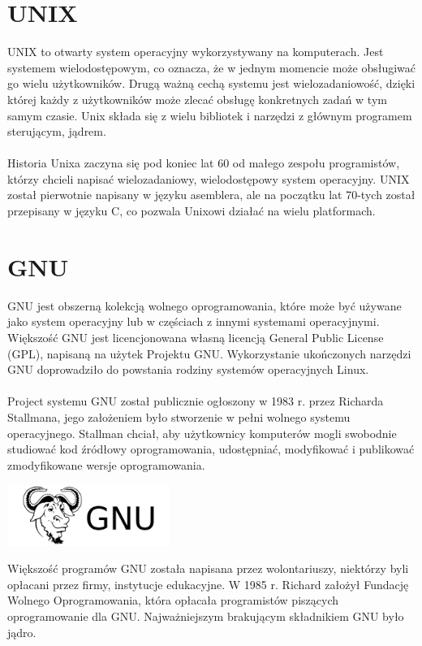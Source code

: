 \documentclass[10pt,a4paper]{report}
\begin{document}
\begin{adjustwidth}{2cm}{2cm}
\section{UNIX}
\begin{minipage}{1\linewidth}
UNIX to otwarty system operacyjny wykorzystywany na komputerach. Jest systemem wielodostępowym, co oznacza, że w jednym momencie może obsługiwać go wielu użytkowników. Drugą ważną cechą systemu jest wielozadaniowość, dzięki której każdy z użytkowników może zlecać obsługę konkretnych zadań w tym samym czasie. Unix składa się z wielu bibliotek i narzędzi z głównym programem sterującym, jądrem. \\ \\

Historia Unixa zaczyna się pod koniec lat 60 od małego zespołu programistów, którzy chcieli napisać wielozadaniowy, wielodostępowy system operacyjny.
UNIX został pierwotnie napisany w języku asemblera, ale na początku lat 70-tych został przepisany w języku  C, co pozwala Unixowi działać na wielu platformach. 
\end{minipage}
\section{GNU}
\begin{minipage}{1\linewidth}
GNU jest obszerną kolekcją wolnego oprogramowania, które może być używane jako system operacyjny lub w częściach z innymi systemami operacyjnymi. Większość GNU jest licencjonowana własną licencją General Public License (GPL), napisaną na użytek Projektu GNU.  Wykorzystanie ukończonych narzędzi GNU doprowadziło do powstania rodziny systemów operacyjnych Linux. \\  \\
Project systemu GNU został publicznie ogłoszony w 1983 r. przez Richarda Stallmana, jego założeniem było stworzenie w pełni wolnego systemu operacyjnego. Stallman chciał, aby użytkownicy komputerów mogli swobodnie studiować kod źródłowy oprogramowania, udostępniać, modyfikować i publikować zmodyfikowane wersje oprogramowania. 
\end{minipage}
 \begin{minipage}{\linewidth}
\begin{center}
  \includegraphics[width=200px]{img/gnu.jpg}
\end{center}
\end{minipage}
\begin{minipage}{1\linewidth}
\vspace{0.2cm}
Większość programów GNU została napisana przez wolontariuszy, niektórzy byli opłacani przez firmy, instytucje edukacyjne. W 1985 r. Richard założył Fundację Wolnego Oprogramowania, która opłacała programistów piszących oprogramowanie dla GNU. Najważniejszym brakującym składnikiem GNU było jądro. 
\end{minipage}

\end{adjustwidth}
\end{document}
